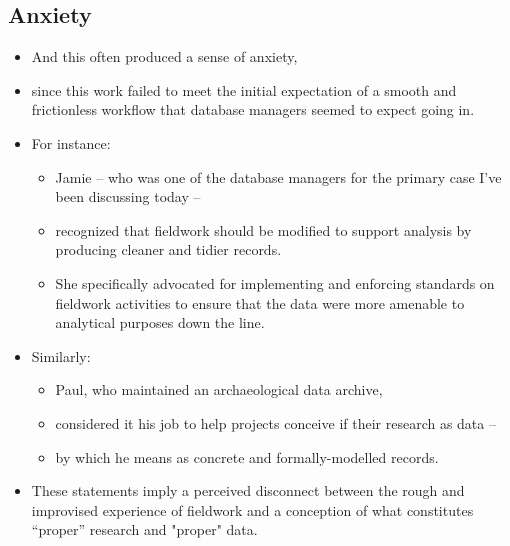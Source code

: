 \documentclass{article}
\begin{document}
\subsection{Anxiety}
\begin{itemize}
  \item And this often produced a sense of anxiety,
  \item since this work failed to meet the initial expectation of a smooth and frictionless workflow that database managers seemed to expect going in.\\

  \item For instance:
  \begin{itemize}
    \item Jamie -- who was one of the database managers for the primary case I've been discussing today --
    \item recognized that fieldwork should be modified to support analysis by producing cleaner and tidier records.
    \item She specifically advocated for implementing and enforcing standards on fieldwork activities to ensure that the data were more amenable to analytical purposes down the line.
  \end{itemize}\vspace{1em}

  \item Similarly:
  \begin{itemize}
    \item Paul, who maintained an archaeological data archive,
    \item considered it his job to help projects conceive if their research as data --
    \item by which he means as concrete and formally-modelled records.
  \end{itemize}\vspace{1em}

  \item These statements imply a perceived disconnect between the rough and improvised experience of fieldwork and a conception of what constitutes ``proper'' research and "proper" data.
\end{itemize}
\end{document}

